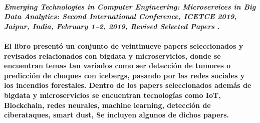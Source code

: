 

\paragraph{
    \textbf{\emph{Emerging Technologies in Computer Engineering: Microservices in Big Data Analytics: Second International Conference, {ICETCE} 2019, Jaipur, India, February 1–2, 2019, Revised Selected Papers}
    }
    \cite{somani_emerging_2019}.
}

\paragraph{
    El libro presentó un conjunto de veintinueve papers seleccionados y revisados relacionados con bigdata y microservicios,
    donde se encuentran temas tan variados como ser detección de tumores o predicción de choques con icebergs, pasando por las redes sociales y los incendios forestales.
    Dentro de los papers seleccionados además de bigdata y microservicios se encuentran tecnologías como IoT, Blockchain,
    redes neurales, machine learning, detección de ciberataques, smart dust,
    Se incluyen algunos de dichos papers.
}







